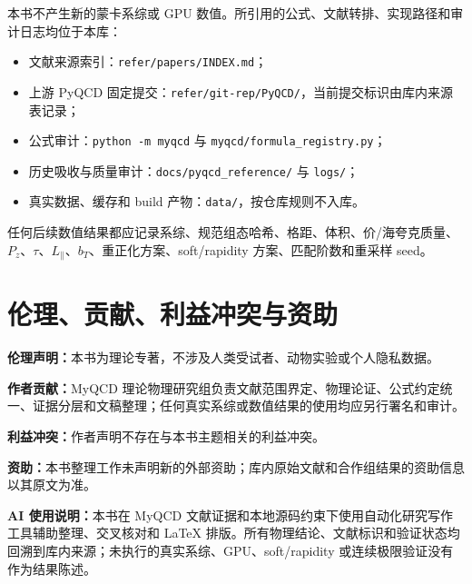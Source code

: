 \documentclass[UTF8,12pt,a4paper,twoside,openany]{ctexbook}
\begin{document}
本书不产生新的蒙卡系综或 GPU 数值。所引用的公式、文献转排、实现路径和审计日志均位于本库：
\begin{itemize}
  \item 文献来源索引：\texttt{refer/papers/INDEX.md}；
  \item 上游 PyQCD 固定提交：\texttt{refer/git-rep/PyQCD/}，当前提交标识由库内来源表记录；
  \item 公式审计：\texttt{python -m myqcd} 与 \texttt{myqcd/formula\_registry.py}；
  \item 历史吸收与质量审计：\texttt{docs/pyqcd\_reference/} 与 \texttt{logs/}；
  \item 真实数据、缓存和 build 产物：\texttt{data/}，按仓库规则不入库。
\end{itemize}
任何后续数值结果都应记录系综、规范组态哈希、格距、体积、价/海夸克质量、\(P_z\)、\(\tau\)、\(L_\parallel\)、\(b_T\)、重正化方案、soft/rapidity 方案、匹配阶数和重采样 seed。

\clearpage
\chapter{伦理、贡献、利益冲突与资助}

\noindent\textbf{伦理声明：}本书为理论专著，不涉及人类受试者、动物实验或个人隐私数据。

\noindent\textbf{作者贡献：}MyQCD 理论物理研究组负责文献范围界定、物理论证、公式约定统一、证据分层和文稿整理；任何真实系综或数值结果的使用均应另行署名和审计。

\noindent\textbf{利益冲突：}作者声明不存在与本书主题相关的利益冲突。

\noindent\textbf{资助：}本书整理工作未声明新的外部资助；库内原始文献和合作组结果的资助信息以其原文为准。

\noindent\textbf{AI 使用说明：}本书在 MyQCD 文献证据和本地源码约束下使用自动化研究写作工具辅助整理、交叉核对和 LaTeX 排版。所有物理结论、文献标识和验证状态均回溯到库内来源；未执行的真实系综、GPU、soft/rapidity 或连续极限验证没有作为结果陈述。

\clearpage









\end{document}
